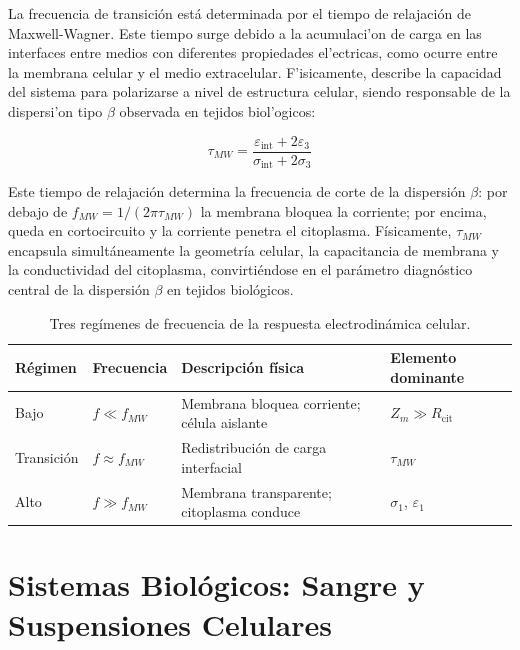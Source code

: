 \documentclass[12pt]{article}
\begin{document}
La frecuencia de transici\'on est\'a determinada por el tiempo de relajaci\'on de Maxwell-Wagner. Este tiempo surge debido a la acumulaci'on de carga en las interfaces entre
medios con diferentes propiedades el'ectricas, como ocurre entre la membrana celular
y el medio extracelular. F'isicamente, describe la capacidad del sistema para
polarizarse a nivel de estructura celular, siendo responsable de la dispersi'on
tipo $\beta$ observada en tejidos biol'ogicos:

\begin{equation}
\tau_{MW} =
\frac{\varepsilon_{\text{int}} + 2\varepsilon_3}{\sigma_{\text{int}} + 2\sigma_3}
\label{eq:tauMW}
\end{equation}

Este tiempo de relajaci\'on determina la frecuencia de corte de la dispersi\'on
$\beta$: por debajo de $f_{MW} = 1/(2\pi\tau_{MW})$ la membrana bloquea la corriente;
por encima, queda en cortocircuito y la corriente penetra el citoplasma. F\'isicamente,
$\tau_{MW}$ encapsula simult\'aneamente la geometr\'ia celular, la capacitancia de
membrana y la conductividad del citoplasma, convirti\'endose en el par\'ametro
diagn\'ostico central de la dispersi\'on $\beta$ en tejidos biol\'ogicos.

\begin{table}[H]
\centering

\caption{Tres reg\'imenes de frecuencia de la respuesta electrodin\'amica celular.}
\label{tab:regimenes}
\begin{tabular}{@{}llll@{}}
\toprule
\textbf{R\'egimen} & \textbf{Frecuencia} & \textbf{Descripci\'on f\'isica}
& \textbf{Elemento dominante} \\
\midrule
Bajo & $f \ll f_{MW}$ & Membrana bloquea corriente; c\'elula aislante
& $Z_m \gg R_{\text{cit}}$ \\
Transici\'on & $f \approx f_{MW}$ & Redistribuci\'on de carga interfacial
& $\tau_{MW}$ \\
Alto & $f \gg f_{MW}$ & Membrana transparente; citoplasma conduce
& $\sigma_1$, $\varepsilon_1$ \\
\bottomrule
\end{tabular}
\end{table}


\section{Sistemas Biol\'ogicos: Sangre y Suspensiones Celulares}
\end{document}
